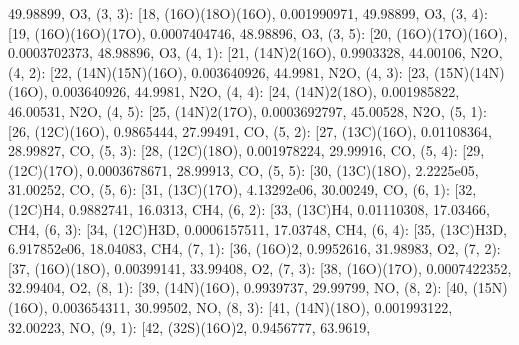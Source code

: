 \documentclass[letterpaper,10pt,english]{sphinxmanual}
\begin{document}
\begin{fulllineitems}
49.98899, \textquotesingle{}O3\textquotesingle{}{]}, (3, 3): {[}18, \textquotesingle{}(16O)(18O)(16O)\textquotesingle{}, 0.001990971, 49.98899, \textquotesingle{}O3\textquotesingle{}{]}, (3, 4): {[}19, \textquotesingle{}(16O)(16O)(17O)\textquotesingle{}, 0.0007404746, 48.98896, \textquotesingle{}O3\textquotesingle{}{]}, (3, 5): {[}20, \textquotesingle{}(16O)(17O)(16O)\textquotesingle{}, 0.0003702373, 48.98896, \textquotesingle{}O3\textquotesingle{}{]}, (4, 1): {[}21, \textquotesingle{}(14N)2(16O)\textquotesingle{}, 0.9903328, 44.00106, \textquotesingle{}N2O\textquotesingle{}{]}, (4, 2): {[}22, \textquotesingle{}(14N)(15N)(16O)\textquotesingle{}, 0.003640926, 44.9981, \textquotesingle{}N2O\textquotesingle{}{]}, (4, 3): {[}23, \textquotesingle{}(15N)(14N)(16O)\textquotesingle{}, 0.003640926, 44.9981, \textquotesingle{}N2O\textquotesingle{}{]}, (4, 4): {[}24, \textquotesingle{}(14N)2(18O)\textquotesingle{}, 0.001985822, 46.00531, \textquotesingle{}N2O\textquotesingle{}{]}, (4, 5): {[}25, \textquotesingle{}(14N)2(17O)\textquotesingle{}, 0.0003692797, 45.00528, \textquotesingle{}N2O\textquotesingle{}{]}, (5, 1): {[}26, \textquotesingle{}(12C)(16O)\textquotesingle{}, 0.9865444, 27.99491, \textquotesingle{}CO\textquotesingle{}{]}, (5, 2): {[}27, \textquotesingle{}(13C)(16O)\textquotesingle{}, 0.01108364, 28.99827, \textquotesingle{}CO\textquotesingle{}{]}, (5, 3): {[}28, \textquotesingle{}(12C)(18O)\textquotesingle{}, 0.001978224, 29.99916, \textquotesingle{}CO\textquotesingle{}{]}, (5, 4): {[}29, \textquotesingle{}(12C)(17O)\textquotesingle{}, 0.0003678671, 28.99913, \textquotesingle{}CO\textquotesingle{}{]}, (5, 5): {[}30, \textquotesingle{}(13C)(18O)\textquotesingle{}, 2.2225e\sphinxhyphen{}05, 31.00252, \textquotesingle{}CO\textquotesingle{}{]}, (5, 6): {[}31, \textquotesingle{}(13C)(17O)\textquotesingle{}, 4.13292e\sphinxhyphen{}06, 30.00249, \textquotesingle{}CO\textquotesingle{}{]}, (6, 1): {[}32, \textquotesingle{}(12C)H4\textquotesingle{}, 0.9882741, 16.0313, \textquotesingle{}CH4\textquotesingle{}{]}, (6, 2): {[}33, \textquotesingle{}(13C)H4\textquotesingle{}, 0.01110308, 17.03466, \textquotesingle{}CH4\textquotesingle{}{]}, (6, 3): {[}34, \textquotesingle{}(12C)H3D\textquotesingle{}, 0.0006157511, 17.03748, \textquotesingle{}CH4\textquotesingle{}{]}, (6, 4): {[}35, \textquotesingle{}(13C)H3D\textquotesingle{}, 6.917852e\sphinxhyphen{}06, 18.04083, \textquotesingle{}CH4\textquotesingle{}{]}, (7, 1): {[}36, \textquotesingle{}(16O)2\textquotesingle{}, 0.9952616, 31.98983, \textquotesingle{}O2\textquotesingle{}{]}, (7, 2): {[}37, \textquotesingle{}(16O)(18O)\textquotesingle{}, 0.00399141, 33.99408, \textquotesingle{}O2\textquotesingle{}{]}, (7, 3): {[}38, \textquotesingle{}(16O)(17O)\textquotesingle{}, 0.0007422352, 32.99404, \textquotesingle{}O2\textquotesingle{}{]}, (8, 1): {[}39, \textquotesingle{}(14N)(16O)\textquotesingle{}, 0.9939737, 29.99799, \textquotesingle{}NO\textquotesingle{}{]}, (8, 2): {[}40, \textquotesingle{}(15N)(16O)\textquotesingle{}, 0.003654311, 30.99502, \textquotesingle{}NO\textquotesingle{}{]}, (8, 3): {[}41, \textquotesingle{}(14N)(18O)\textquotesingle{}, 0.001993122, 32.00223, \textquotesingle{}NO\textquotesingle{}{]}, (9, 1): {[}42, \textquotesingle{}(32S)(16O)2\textquotesingle{}, 0.9456777, 63.9619, 
\end{fulllineitems}
\end{document}
